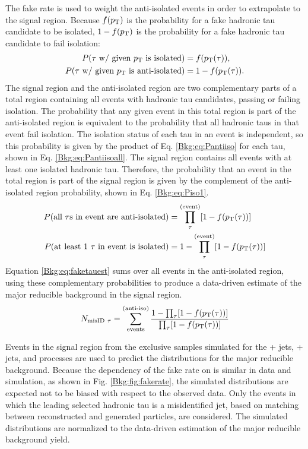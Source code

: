 The fake rate is used to weight the anti-isolated events in order to extrapolate to the signal region. Because $f(p_{\mathrm{T}})$ is the probability for a fake hadronic tau candidate to be isolated, $1-f(p_{\mathrm{T}})$ is the probability for a fake hadronic tau candidate to fail isolation:
\begin{align}
P(\tau\text{ w/ given \pt is isolated}) &= f(\pt(\tau)), \\
P(\tau\text{ w/ given \pt is anti-isolated}) &= 1 - f(\pt(\tau)). \label{Bkg:eq:Pantiiso}
\end{align}
The signal region and the anti-isolated region are two complementary parts of a total region containing all events with hadronic tau candidates, passing or failing isolation. The probability that any given event in this total region is part of the anti-isolated region is equivalent to the probability that all hadronic taus in that event fail isolation. The isolation status of each tau in an event is independent, so this probability is given by the product of Eq. \eqref{Bkg:eq:Pantiiso} for each tau, shown in Eq. \eqref{Bkg:eq:Pantiisoall}. The signal region contains all events with at least one isolated hadronic tau. Therefore, the probability that an event in the total region is part of the signal region is given by the complement of the anti-isolated region probability, shown in Eq. \eqref{Bkg:eq:Piso1}.
\begin{align}
P(\text{all }\tau\text{s in event are anti-isolated}) &= \prod_{\tau}^{\text{(event)}}[1-f(p_{\mathrm{T}}(\tau))] \label{Bkg:eq:Pantiisoall} \\
P(\text{at least 1 }\tau\text{ in event is isolated}) &= 1-\prod_{\tau}^{\text{(event)}}[1-f(p_{\mathrm{T}}(\tau))] \label{Bkg:eq:Piso1}
\end{align}
Equation \eqref{Bkg:eq:faketauest} sums over all events in the anti-isolated region, using these complementary probabilities to produce a data-driven estimate of the major reducible background in the signal region.
\begin{equation} N_{\text{misID}~\tau} = \sum_{\text{events}}^{\text{(anti-iso)}} \frac{1 - \prod_{\tau}[1-f(p_{\mathrm{T}}(\tau))]}{\prod_{\tau}[1-f(p_{\mathrm{T}}(\tau))]} \label{Bkg:eq:faketauest} \end{equation}

Events in the signal region from the exclusive samples simulated for the \W + jets, \Z + jets, and \ttbar processes are used to predict the \ST distributions for the major reducible background. Because the dependency of the fake rate on \pt is similar in data and simulation, as shown in Fig. \ref{Bkg:fig:fakerate}, the simulated distributions are expected not to be biased with respect to the observed data. Only the events in which the leading selected hadronic tau is a misidentified jet, based on matching between reconstructed and generated particles, are considered. The simulated distributions are normalized to the data-driven estimation of the major reducible background yield.

